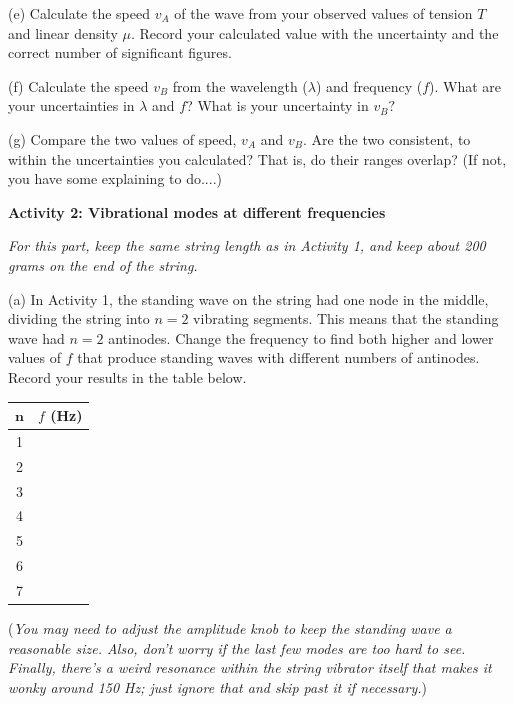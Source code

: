 \pagebreak[3]

(e) Calculate the speed $v_A$ of the wave from your observed values of tension
$T$ and linear density $\mu$. Record your calculated value with the uncertainty and the correct number of significant
figures.
\answerspace{4cm}

(f) Calculate the speed $v_B$ from the wavelength ($\lambda $) and frequency ($f$).  What are your uncertainties in $\lambda$ and $f$?  What is your uncertainty in $v_B?$
\answerspace{4cm}

(g) Compare the two values of speed, $v_A$ and $v_B$.  Are the two consistent, to within the uncertainties you calculated?  That is, do their ranges overlap?  (If not, you have some explaining to do....) 
\answerspace{3cm}

\pagebreak[2]
\textbf{Activity 2: Vibrational modes at different frequencies}

\textit{For this part, keep the same string length as in Activity 1, and keep about 200 grams on the end of the string.}

(a) In Activity 1, the standing wave on the string had one node in the middle, dividing the string into $n=2$ vibrating segments.  This means that the standing wave had $n=2$ antinodes.  Change the frequency to find both higher and lower values of $f$ that produce standing waves with different numbers of antinodes.  Record your results in the table below.
\begin{center} 
\begin{tabular}{|c|c|} 
\hline $\mathbf{n}$ & \boldmath$f$ \textbf{(Hz)} \\ 
\hline 1 &  \\ 
\hline 2 &  \\ 
\hline 3 &  \\ 
\hline 4 &  \\ 
\hline 5 &  \\ 
\hline 6 &  \\ 
\hline 7 &  \\ 
\hline 
\end{tabular} 
\end{center}

(\textit{You may need to adjust the amplitude knob to keep the standing wave a reasonable size.  Also, don't worry if the last few modes are too hard to see.  Finally, there's a weird resonance within the string vibrator itself that makes it wonky around 150 Hz; just ignore that and skip past it if necessary.})

\pagebreak[3]


